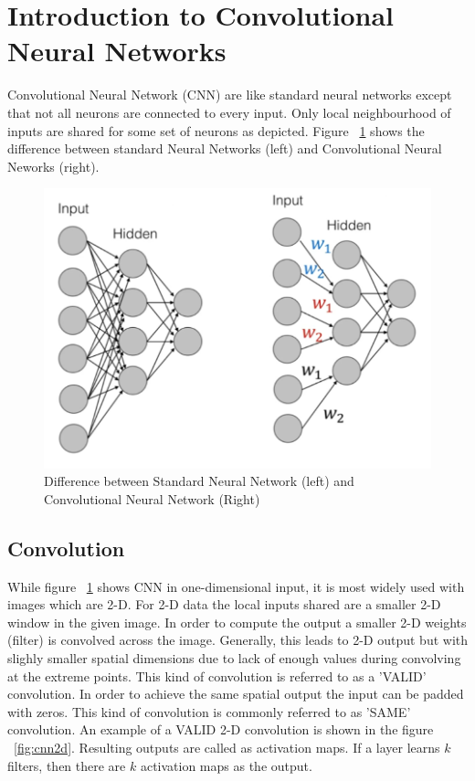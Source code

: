 \section{Introduction to Convolutional Neural Networks}

Convolutional Neural Network (CNN) are like standard neural networks except that not all neurons are connected to every input. 
Only local neighbourhood of inputs are shared for some set of neurons as depicted. Figure ~\ref{fig:cnn} shows the difference between standard Neural Networks (left) and Convolutional Neural Neworks (right).

\begin{figure}[H]
	\centering
   \includegraphics[scale=0.46]{figures/intro/cnn.png}
   \caption[Convolutional Neural Network]{Difference between Standard Neural Network (left) and Convolutional Neural Network (Right)}
   \label{fig:cnn}
\end{figure}

\subsection{Convolution}

While figure ~\ref{fig:cnn} shows CNN in one-dimensional input, it is most widely used with images which are 2-D.
For 2-D data the local inputs shared are a smaller 2-D window in the given image. 
In order to compute the output a smaller 2-D weights (filter) is convolved across the image. 
Generally, this leads to 2-D output but with slighly smaller spatial dimensions due to lack of enough values during convolving at the extreme points. This kind of convolution is referred to as a 'VALID' convolution. In order to achieve the same spatial output the input can be padded with zeros. This kind of convolution is commonly referred to as 'SAME' convolution. An example of a VALID 2-D convolution is shown in the figure ~\ref{fig:cnn2d}. Resulting outputs are called as activation maps. If a layer learns $k$ filters, then there are $k$ activation maps as the output.


